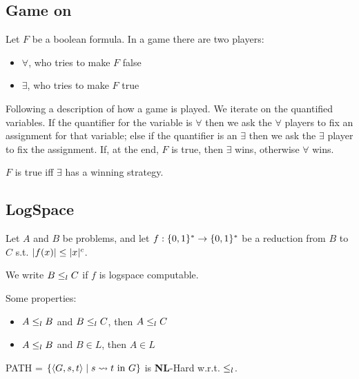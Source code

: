 \subsection{Game on \QBF}\label{subsec:game_qbf}

    Let $F$ be a boolean formula. In a game there are two players:
    \begin{itemize}
        \item $\forall$, who tries to make $F$ false
        \item $\exists$, who tries to make $F$ true
    \end{itemize}

    Following a description of how a game is played. We iterate on the quantified variables.
    If the quantifier for the variable is $\forall$ then we ask the $\forall$ players to fix an assignment for that variable; else if the quantifier is an $\exists$ then we ask the $\exists$ player to fix the assignment.
    If, at the end, $F$ is true, then $\exists$ wins, otherwise $\forall$ wins.

    $F$ is true iff $\exists$ has a winning strategy.


\subsection{LogSpace}\label{subsec:log_space}

    \begin{definition}\label{def:logspace_reduction}
        Let $A$ and $B$ be problems, and let $f : \{ 0,1 \}^* \rightarrow \{ 0,1 \}^*$ be a reduction from $B$ to $C$ s.t. $\vert f(x) \vert \leq \vert x \vert^c$.

        We write $B \leq_l C$ if $f$ is logspace computable.
    \end{definition}

    Some properties:
    \begin{itemize}
        \item $A \leq_l B$ and $B \leq_l C$, then $A \leq_l C$
        \item $A \leq_l B$ and $B \in L$, then $A \in L$
    \end{itemize}

    \begin{theorem}\label{thm:path_nl_complete}
        PATH = $ \{ \text{\textlangle} G, s, t \text{\textrangle} \st s \leadsto t \text{ in } G \} $ is \textbf{NL}-Hard w.r.t. $\leq_l$.
    \end{theorem}

